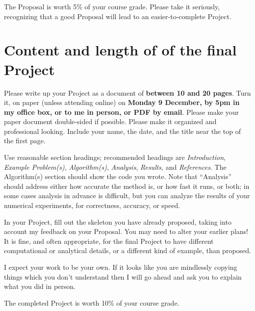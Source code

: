 \documentclass[11pt]{amsart}
\begin{document}
The Proposal is worth 5\% of your course grade.  Please take it seriously, recognizing that a good Proposal will lead to an easier-to-complete Project.


\section*{Content and length of of the final Project}  

Please write up your Project as a document of \textbf{between 10 and 20 pages}.  Turn it, on paper (unless attending online) on \textbf{{\color{BrickRed} Monday 9 December}, by 5pm in my office box, or to me in person, or PDF by email}.  Please make your paper document double-sided if possible.  Please make it organized and professional looking.  Include your name, the date, and the title near the top of the first page.

Use reasonable section headings; recommended headings are \emph{Introduction}, \emph{Example Problem(s)}, \emph{Algorithm(s)}, \emph{Analysis}, \emph{Results}, and \emph{References}.  The Algorithm(s) section should show the code you wrote.  Note that ``Analysis'' should address either how accurate the method is, or how fast it runs, or both; in some cases analysis in advance is difficult, but you can analyze the results of your numerical experiments, for correctness, accuracy, or speed.

In your Project, fill out the skeleton you have already proposed, taking into account my feedback on your Proposal.  You may need to alter your earlier plans!  It is fine, and often appropriate, for the final Project to have different computational or analytical details, or a different kind of example, than proposed.

I expect your work to be your own.  If it looks like you are mindlessly copying things which you don't understand then I will go ahead and ask you to explain what you did in person.

The completed Project is worth 10\% of your course grade.
\end{document}
